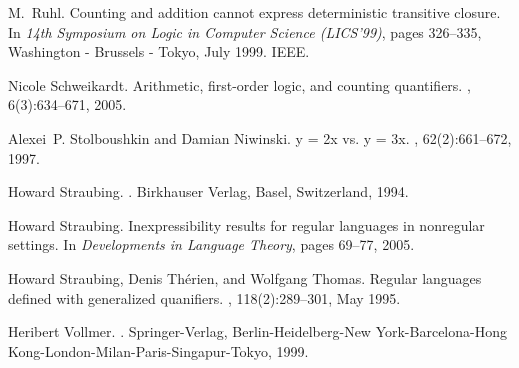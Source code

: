\documentclass[envcountsame]{llncs}
\begin{document}
\begin{thebibliography}{10}
M.~Ruhl.
\newblock Counting and addition cannot express deterministic transitive
  closure.
\newblock In {\em 14th Symposium on Logic in Computer Science ({LICS}'99)},
  pages 326--335, Washington - Brussels - Tokyo, July 1999. IEEE.

Nicole Schweikardt.
\newblock Arithmetic, first-order logic, and counting quantifiers.
, 6(3):634--671, 2005.

Alexei~P. Stolboushkin and Damian Niwinski.
\newblock y = 2x vs. y = 3x.
, 62(2):661--672, 1997.

Howard Straubing.
.
\newblock Birkhauser Verlag, Basel, Switzerland, 1994.

Howard Straubing.
\newblock Inexpressibility results for regular languages in nonregular
  settings.
\newblock In {\em Developments in Language Theory}, pages 69--77, 2005.

Howard Straubing, Denis Th{\'e}rien, and Wolfgang Thomas.
\newblock Regular languages defined with generalized quanifiers.
, 118(2):289--301, May 1995.

Heribert Vollmer.
.
\newblock Springer-Verlag, Berlin-Heidelberg-New York-Barcelona-Hong
  Kong-London-Milan-Paris-Singapur-Tokyo, 1999.

\end{thebibliography}
\end{document}
